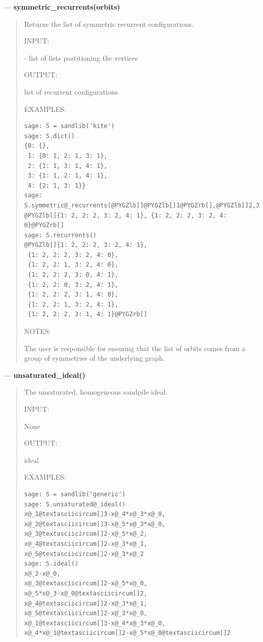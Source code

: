 \documentclass[letterpaper,10pt,english]{manual}
\begin{document}
---
\hypertarget{symmetric-recurrents-orbits}{}
\textbf{symmetric\_recurrents(orbits)}
\begin{quote}

Returns the list of symmetric recurrent configurations.

INPUT:

 - list of lists partitioning the vertices

OUTPUT:

list of recurrent configurations

EXAMPLES:

\begin{Verbatim}[commandchars=@\[\]]
sage: S = sandlib('kite')
sage: S.dict()
{0: {},
 1: {0: 1, 2: 1, 3: 1},
 2: {1: 1, 3: 1, 4: 1},
 3: {1: 1, 2: 1, 4: 1},
 4: {2: 1, 3: 1}}
sage: S.symmetric@_recurrents(@PYGZlb[]@PYGZlb[]1@PYGZrb[],@PYGZlb[]2,3@PYGZrb[],@PYGZlb[]4@PYGZrb[]@PYGZrb[])
@PYGZlb[]{1: 2, 2: 2, 3: 2, 4: 1}, {1: 2, 2: 2, 3: 2, 4: 0}@PYGZrb[]
sage: S.recurrents()
@PYGZlb[]{1: 2, 2: 2, 3: 2, 4: 1},
 {1: 2, 2: 2, 3: 2, 4: 0},
 {1: 2, 2: 1, 3: 2, 4: 0},
 {1: 2, 2: 2, 3: 0, 4: 1},
 {1: 2, 2: 0, 3: 2, 4: 1},
 {1: 2, 2: 2, 3: 1, 4: 0},
 {1: 2, 2: 1, 3: 2, 4: 1},
 {1: 2, 2: 2, 3: 1, 4: 1}@PYGZrb[]
\end{Verbatim}

NOTES:

The user is responsible for ensuring that the list of orbits comes from
a group of symmetries of the underlying graph.
\end{quote}

---
\hypertarget{unsaturated-ideal}{}
\textbf{unsaturated\_ideal()}
\begin{quote}

The unsaturated, homogeneous sandpile ideal.

INPUT:

None

OUTPUT:

ideal

EXAMPLES:

\begin{Verbatim}[commandchars=@\[\]]
sage: S = sandlib('generic')
sage: S.unsaturated@_ideal()
x@_1@textasciicircum[]3-x@_4*x@_3*x@_0,
x@_2@textasciicircum[]3-x@_5*x@_3*x@_0,
x@_3@textasciicircum[]2-x@_5*x@_2,
x@_4@textasciicircum[]2-x@_3*x@_1,
x@_5@textasciicircum[]2-x@_3*x@_2
sage: S.ideal()
x@_2-x@_0,
x@_3@textasciicircum[]2-x@_5*x@_0,
x@_5*x@_3-x@_0@textasciicircum[]2,
x@_4@textasciicircum[]2-x@_3*x@_1,
x@_5@textasciicircum[]2-x@_3*x@_0,
x@_1@textasciicircum[]3-x@_4*x@_3*x@_0,
x@_4*x@_1@textasciicircum[]2-x@_5*x@_0@textasciicircum[]2
\end{Verbatim}
\end{quote}
\end{document}
